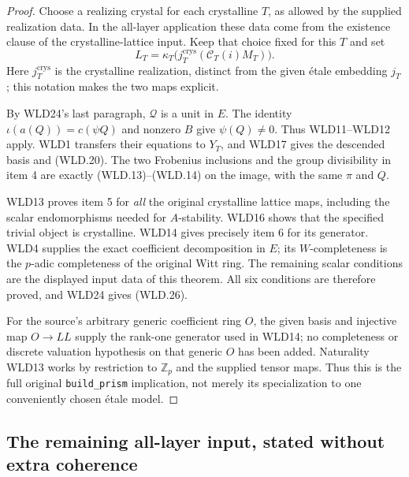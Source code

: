 \documentclass[11pt,a4paper]{article}
\numberwithin{equation}{section}
\theoremstyle{remark}\newtheorem{remark}[theorem]{Remark}
\begin{document}
\begin{proof}
Choose a realizing crystal for each crystalline $T$, as allowed
by the supplied realization data. In the all-layer application
these data come from the existence clause of the crystalline-lattice
input. Keep that choice fixed for this $T$ and set
\[
             L_T=\kappa_T\bigl(j_T^{\mathrm{crys}}
                                  (\mathcal C_T(i)M_T)\bigr).
\]
Here $j_T^{\mathrm{crys}}$ is the crystalline realization, distinct
from the given \'etale embedding $j_T$; this notation makes the
two maps explicit.

By WLD24's last paragraph, $\mathcal Q$ is a unit in $E$.
The identity $\iota(a(Q))=c(\psi Q)$ and nonzero $B$
give $\psi(Q)\ne0$. Thus WLD11--WLD12 apply.
WLD1 transfers their equations to $Y_T$, and WLD17 gives
the descended basis and (WLD.20). The two Frobenius inclusions
and the group divisibility in item 4 are exactly (WLD.13)--(WLD.14)
on the image, with the same $\pi$ and $Q$.

WLD13 proves item 5 for \emph{all} the original crystalline
lattice maps, including the scalar endomorphisms needed for
$A$-stability. WLD16 shows that the specified trivial object
is crystalline. WLD14 gives precisely item 6 for its generator.
WLD4 supplies the exact coefficient decomposition in $E$;
its $W$-completeness is the $p$-adic completeness of the original
Witt ring. The remaining scalar conditions are the displayed
input data of this theorem. All six conditions are therefore
proved, and WLD24 gives (WLD.26).

For the source's arbitrary generic coefficient ring $O$, the given
basis and injective map $O\to LL$ supply the rank-one generator
used in WLD14; no completeness or discrete valuation hypothesis
on that generic $O$ has been added. Naturality WLD13 works by
restriction to $\mathbb Z_p$ and the supplied tensor maps.
Thus this is the full original \texttt{build\_\allowbreak prism} implication,
not merely its specialization to one conveniently chosen \'etale model.
\end{proof}

\subsection{The remaining all-layer input, stated without extra coherence}

\end{document}
